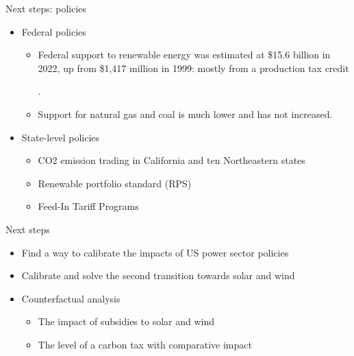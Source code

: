 \documentclass{beamer}
\begin{document}





\begin{frame}{Next steps: policies}
\small
\begin{itemize}
\item Federal policies
\begin{itemize}
 \item Federal support to renewable energy was estimated at  \$15.6 billion in 2022, up from \$1,417 million in 1999: mostly from a production tax credit
 
 .
 \item Support for natural gas and coal is much lower and has not increased.
\end{itemize}
 \end{itemize}
 \begin{itemize}
 \item State-level policies
 \begin{itemize}
     \item CO2 emission trading in California and ten Northeastern states
     \item Renewable portfolio standard (RPS)
     \item Feed-In Tariff Programs
 \end{itemize}
 
 \end{itemize}
 

\end{frame}

\begin{frame}{Next steps}
\begin{itemize}
    \item Find a way to calibrate the impacts of US power sector policies
    \item Calibrate and solve the second transition towards solar and wind
    \item Counterfactual analysis
    \begin{itemize}
        \item The impact of subsidies to solar and wind
        \item The level of a carbon tax with comparative impact
    \end{itemize}
\end{itemize}

\end{frame}
\end{document}
